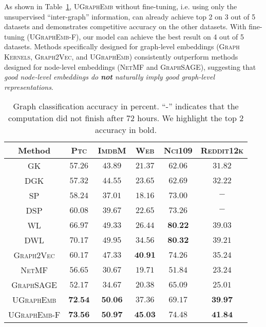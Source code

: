 \documentclass{article}
\newcommand{\model}{\textsc{UGraphEmb}\xspace}
\newcommand{\netmf}{\textsc{NetMF}\xspace}
\newcommand{\graphsage}{\textsc{GraphSAGE}\xspace}
\newcommand{\gk}{\textsc{Graph Kernels}\xspace}
\newcommand{\gv}{\textsc{Graph2Vec}\xspace}
\newcommand{\ptc}{\textsc{Ptc}\xspace}
\newcommand{\imdb}{\textsc{ImdbM}\xspace}
\newcommand{\web}{\textsc{Web}\xspace}
\newcommand{\nci}{\textsc{Nci109}\xspace}
\newcommand{\reddit}{\textsc{Reddit12k}\xspace}
\begin{document}
As shown in Table~\ref{table:classif_results},
\model without fine-tuning, i.e. using only the unsupervised ``inter-graph'' information, can already achieve top 2 on 3 out of 5 datasets and demonstrates competitive accuracy on the other datasets. With fine-tuning (\textsc{\model-F}), our model can achieve the best result on 4 
out of 5 datasets. Methods specifically designed for graph-level embeddings (\gk, \gv, and \model) consistently outperform methods designed for node-level embeddings (\netmf and \graphsage), suggesting that \textit{good node-level embeddings do \textbf{not} naturally imply good graph-level representations}.

\begin{table}
\scriptsize
\centering
\begin{tabular}{cccccc}
    \toprule
    \textbf{Method} & \textbf{\ptc} & \textbf{\imdb} & \textbf{\web} & \textbf{\nci} & \textbf{\reddit} \\
      \midrule
      


    \textsc{GK} & $57.26$ & $43.89$ & $21.37$ & $62.06$ & $31.82$ \\
    \textsc{DGK} & $57.32$ & $44.55$ & $23.65$ & $62.69$ & $32.22$ \\ 
    \textsc{SP} & $58.24$ & $37.01$ & $18.16$ & $73.00$ & $-$ \\
    \textsc{DSP} & $60.08$ & $39.67$ & $22.65$ & $73.26$ & $-$ \\
    \textsc{WL} & $66.97$ & $49.33$ & $26.44$ & $\textbf{80.22}$ & $39.03$ \\ 
    \textsc{DWL} & $70.17$ & $49.95$ & $34.56$ & $\textbf{80.32}$ & $39.21$ \\ \hline
    \gv & $60.17$ & $47.33$ & $\textbf{40.91}$ & $74.26$ & $35.24$ \\
    \netmf & $56.65$ & $30.67$ & $19.71$ & $51.84$ & $23.24$ \\
    \graphsage & $52.17$ & $34.67$ & $20.38$ & $65.09$ & $25.01$ \\
\hline
\textsc{\model} & $\textbf{72.54}$ & $\textbf{50.06}$ & $37.36$ & $69.17$ & $\textbf{39.97}$ \\
    \textsc{\model-F} & $\textbf{73.56}$ & $\textbf{50.97}$ & $\textbf{45.03}$ & $74.48$ & $\textbf{41.84}$ \\ \hline
\end{tabular}
\centering
\caption{Graph classification accuracy in percent. ``-'' indicates that the computation did not finish after 72 hours. We highlight the top 2 accuracy in bold.}
\label{table:classif_results}
\end{table}
\end{document}
